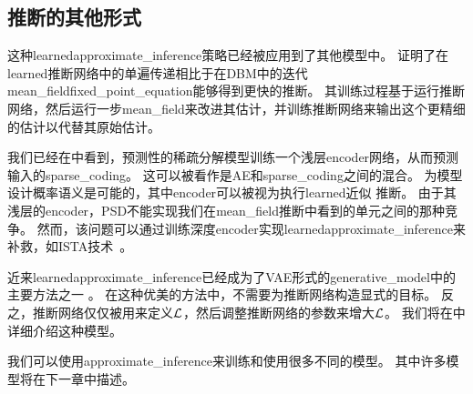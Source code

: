 \subsection{推断的其他形式}
\label{sec:other_forms_of_learned_inference}

这种\gls{learned}\gls{approximate_inference}策略已经被应用到了其他模型中。
\citet{Salakhutdinov+Larochelle-2010}证明了在\gls{learned}推断网络中的单遍传递相比于在\gls{DBM}中的迭代\gls{mean_field}\gls{fixed_point_equation}能够得到更快的推断。
其训练过程基于运行推断网络，然后运行一步\gls{mean_field}来改进其估计，并训练推断网络来输出这个更精细的估计以代替其原始估计。


我们已经在中看到，预测性的稀疏分解模型训练一个浅层\gls{encoder}网络，从而预测输入的\gls{sparse_coding}。
这可以被看作是\gls{AE}和\gls{sparse_coding}之间的混合。
为模型设计概率语义是可能的，其中\gls{encoder}可以被视为执行\gls{learned}近似\,\,推断。
由于其浅层的\gls{encoder}，PSD不能实现我们在\gls{mean_field}推断中看到的单元之间的那种竞争。
然而，该问题可以通过训练深度\gls{encoder}实现\gls{learned}\gls{approximate_inference}来补救，如ISTA技术~\citep{Gregor+LeCun-ICML2010}。


近来\gls{learned}\gls{approximate_inference}已经成为了\gls{VAE}形式的\gls{generative_model}中的主要方法之一 \citep{Kingma+Welling-ICLR2014,Rezende-et-al-ICML2014}。
在这种优美的方法中，不需要为推断网络构造显式的目标。
反之，推断网络仅仅被用来定义$\mathcal{L}$，然后调整推断网络的参数来增大$\mathcal{L}$。
我们将在中详细介绍这种模型。

我们可以使用\gls{approximate_inference}来训练和使用很多不同的模型。
其中许多模型将在下一章中描述。
















